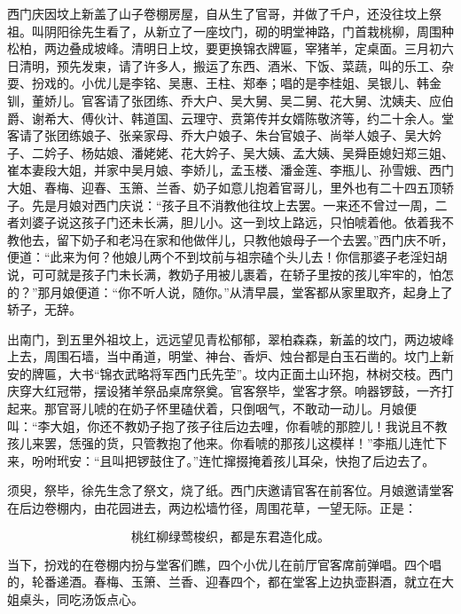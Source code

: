 西门庆因坟上新盖了山子卷棚房屋，自从生了官哥，并做了千户，还没往坟上祭祖。叫阴阳徐先生看了，从新立了一座坟门，砌的明堂神路，门首栽桃柳，周围种松柏，两边叠成坡峰。清明日上坟，要更换锦衣牌匾，宰猪羊，定桌面。三月初六日清明，预先发柬，请了许多人，搬运了东西、酒米、下饭、菜蔬，叫的乐工、杂耍、扮戏的。小优儿是李铭、吴惠、王柱、郑奉；唱的是李桂姐、吴银儿、韩金钏，董娇儿。官客请了张团练、乔大户、吴大舅、吴二舅、花大舅、沈姨夫、应伯爵、谢希大、傅伙计、韩道国、云理守、贲第传并女婿陈敬济等，约二十余人。堂客请了张团练娘子、张亲家母、乔大户娘子、朱台官娘子、尚举人娘子、吴大妗子、二妗子、杨姑娘、潘姥姥、花大妗子、吴大姨、孟大姨、吴舜臣媳妇郑三姐、崔本妻段大姐，并家中吴月娘、李娇儿，孟玉楼、潘金莲、李瓶儿、孙雪娥、西门大姐、春梅、迎春、玉箫、兰香、奶子如意儿抱着官哥儿，里外也有二十四五顶轿子。先是月娘对西门庆说：“孩子且不消教他往坟上去罢。一来还不曾过一周，二者刘婆子说这孩子门还未长满，胆儿小。这一到坟上路远，只怕唬着他。依着我不教他去，留下奶子和老冯在家和他做伴儿，只教他娘母子一个去罢。”西门庆不听，便道：“此来为何？他娘儿两个不到坟前与祖宗磕个头儿去！你信那婆子老淫妇胡说，可可就是孩子门未长满，教奶子用被儿裹着，在轿子里按的孩儿牢牢的，怕怎的？”那月娘便道：“你不听人说，随你。”从清早晨，堂客都从家里取齐，起身上了轿子，无辞。

出南门，到五里外祖坟上，远远望见青松郁郁，翠柏森森，新盖的坟门，两边坡峰上去，周围石墙，当中甬道，明堂、神台、香炉、烛台都是白玉石凿的。坟门上新安的牌匾，大书“锦衣武略将军西门氏先茔”。坟内正面土山环抱，林树交枝。西门庆穿大红冠带，摆设猪羊祭品桌席祭奠。官客祭毕，堂客才祭。响器锣鼓，一齐打起来。那官哥儿唬的在奶子怀里磕伏着，只倒咽气，不敢动一动儿。月娘便叫：“李大姐，你还不教奶子抱了孩子往后边去哩，你看唬的那腔儿！我说且不教孩儿来罢，恁强的货，只管教抱了他来。你看唬的那孩儿这模样！”李瓶儿连忙下来，吩咐玳安：“且叫把锣鼓住了。”连忙撺掇掩着孩儿耳朵，快抱了后边去了。

须臾，祭毕，徐先生念了祭文，烧了纸。西门庆邀请官客在前客位。月娘邀请堂客在后边卷棚内，由花园进去，两边松墙竹径，周围花草，一望无际。正是：

\[
桃红柳绿莺梭织，都是东君造化成。
\]

当下，扮戏的在卷棚内扮与堂客们瞧，四个小优儿在前厅官客席前弹唱。四个唱的，轮番递酒。春梅、玉箫、兰香、迎春四个，都在堂客上边执壶斟酒，就立在大姐桌头，同吃汤饭点心。

